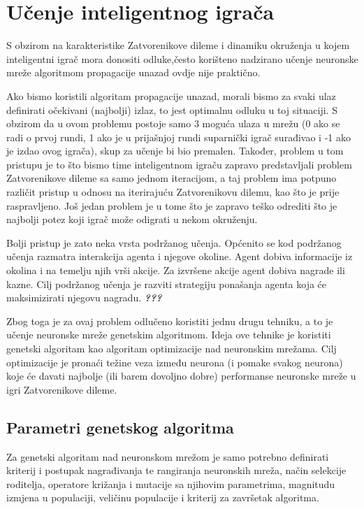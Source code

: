 \documentclass[zavrsnirad]{fer}
\begin{document}
	\section{Učenje inteligentnog igrača}
	\label{pog:Ucenje}
	
	S obzirom na karakteristike Zatvorenikove dileme i dinamiku okruženja u kojem inteligentni igrač mora donositi odluke,često korišteno nadzirano učenje neuronske mreže algoritmom propagacije unazad ovdje nije praktično.
	
	Ako bismo koristili algoritam propagacije unazad, morali bismo za svaki ulaz definirati očekivani (najbolji) izlaz, to jest optimalnu odluku u toj situaciji. S obzirom da u ovom problemu postoje samo 3 moguća ulaza u mrežu (0 ako se radi o prvoj rundi, 1 ako je u prijašnjoj rundi suparnički igrač surađivao i -1 ako je izdao ovog igrača), skup za učenje bi bio premalen. Također, problem u tom pristupu je to što bismo time inteligentnom igraču zapravo predstavljali problem Zatvorenikove dileme sa samo jednom iteracijom, a taj problem ima potpuno različit pristup u odnosu na iterirajuću Zatvorenikovu dilemu, kao što je prije raspravljeno. Još jedan problem je u tome što je zapravo teško odrediti što je najbolji potez koji igrač može odigrati u nekom okruženju. 
	
	Bolji pristup je zato neka vrsta podržanog učenja. Općenito se kod podržanog učenja razmatra interakcija agenta i njegove okoline. Agent dobiva informacije iz okolina i na temelju njih vrši akcije. Za izvršene akcije agent dobiva nagrade ili kazne. Cilj podržanog učenja je razviti strategiju ponašanja agenta koja će maksimizirati njegovu nagradu. \textit{\textbf{???}}
	
	Zbog toga je za ovaj problem odlučeno koristiti jednu drugu tehniku, a to je učenje neuronske mreže genetskim algoritmom. Ideja ove tehnike je koristiti genetski algoritam kao algoritam optimizacije nad neuronskim mrežama. Cilj optimizacije je pronaći težine veza između neurona (i pomake svakog neurona) koje će davati najbolje (ili barem dovoljno dobre) performanse neuronske mreže u igri Zatvorenikove dileme.
	
	\subsection{Parametri genetskog algoritma}
	\label{pog:ParametriGenetskogAlg}
	
		Za genetski algoritam nad neuronskom mrežom je samo potrebno definirati kriterij i postupak nagrađivanja te rangiranja neuronskih mreža, način selekcije roditelja, operatore križanja i mutacije sa njihovim parametrima, magnitudu izmjena u populaciji, veličinu populacije i kriterij za završetak algoritma.
		
\end{document}
